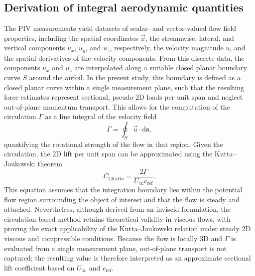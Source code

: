 \documentclass[wes, manuscript]{copernicus}
\begin{document}
\subsection{Derivation of integral aerodynamic quantities}\label{sec:integral_aerodynamic_quantities}
%

The PIV measurements yield datasets of scalar- and vector-valued flow field properties, including the spatial coordinates $\vec{x}$, the streamwise, lateral, and vertical components $u_x$, $u_y$, and $u_z$, respectively, the velocity magnitude $u$, and the spatial derivatives of the velocity components. From this discrete data, the components $u_x$ and $u_z$ are interpolated along a suitable closed planar boundary curve $S$ around the airfoil. 
In the present study, this boundary is defined as a closed planar curve within a single measurement plane, such that the resulting force estimates represent sectional, pseudo-2D loads per unit span and neglect out-of-plane momentum transport.
This allows for the computation of the circulation $\Gamma$ as a line integral of the velocity field
\begin{equation}
    \Gamma = \oint_{S} \vec{u} \cdot \textrm{d}\mathbf{s} ,
\end{equation}
quantifying the rotational strength of the flow in that region.
Given the circulation, the 2D lift per unit span can be approximated using the Kutta--Joukowski theorem \citep{Anderson2016}
\begin{equation}
    C_{\textrm{l,Kutta}} = \frac{2\Gamma}{U_{\infty}c_{\textrm{ref}}} .
\end{equation}
This equation assumes that the integration boundary lies within the potential flow region surrounding the object of interest and that the flow is steady and attached. 
Nevertheless, although derived from an inviscid formulation, the circulation-based method retains theoretical validity in viscous flows, with \cite{Liu2015} proving the exact applicability of the Kutta–Joukowski relation under steady 2D viscous and compressible conditions. 
Because the flow is locally 3D and $\Gamma$ is evaluated from a single measurement plane, out-of-plane transport is not captured; the resulting value is therefore interpreted as an approximate sectional lift coefficient based on $U_{\infty}$ and $c_{\mathrm{ref}}$.
\end{document}
